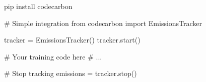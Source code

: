 pip install codecarbon

# Simple integration
from codecarbon import EmissionsTracker

tracker = EmissionsTracker()
tracker.start()

# Your training code here
# ...

# Stop tracking
emissions = tracker.stop()